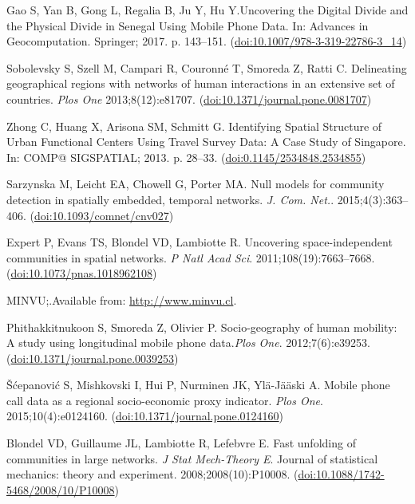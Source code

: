 \documentclass[%
preprint,
 amsmath,amssymb,
pra,
]{revtex4-1}
\begin{document}
\begin{thebibliography}{10}
Gao S, Yan B, Gong L, Regalia B, Ju Y, Hu Y.Uncovering the Digital Divide and the Physical Divide in Senegal Using Mobile Phone Data. In: Advances in Geocomputation. Springer; 2017. p. 143--151. (\href{https://dx.doi.org/10.1007/978-3-319-22786-3\_14}{doi:10.1007/978-3-319-22786-3\_14})

Sobolevsky S, Szell M, Campari R, Couronn{\'e} T, Smoreda Z, Ratti C. Delineating geographical regions with networks of human interactions in an extensive set of countries. \emph{Plos One} 2013;8(12):e81707. (\href{https://dx.doi.org/10.1371/journal.pone.0081707}{doi:10.1371/journal.pone.0081707})

Zhong C, Huang X, Arisona SM, Schmitt G. Identifying Spatial Structure of Urban Functional Centers Using Travel Survey Data: A Case Study of Singapore. In: COMP@ SIGSPATIAL; 2013. p. 28--33. (\href{https://dx.doi.org/0.1145/2534848.2534855}{doi:0.1145/2534848.2534855})

Sarzynska M, Leicht EA, Chowell G, Porter MA. Null models for community detection in spatially embedded, temporal networks. \emph{J. Com. Net.}. 2015;4(3):363--406. (\href{https://dx.doi.org/10.1093/comnet/cnv027}{doi:10.1093/comnet/cnv027})

Expert P, Evans TS, Blondel VD, Lambiotte R. Uncovering space-independent communities in spatial networks. \emph{P Natl Acad Sci}. 2011;108(19):7663--7668. (\href{https://dx.doi.org/10.1073/pnas.1018962108}{doi:10.1073/pnas.1018962108})

MINVU;.Available from: \url{http://www.minvu.cl}.

Phithakkitnukoon S, Smoreda Z, Olivier P. Socio-geography of human mobility: A study using longitudinal mobile phone data.\emph{Plos One}. 2012;7(6):e39253. (\href{https://dx.doi.org/10.1371/journal.pone.0039253}{doi:10.1371/journal.pone.0039253})

{\v{S}}{\'c}epanovi{\'c} S, Mishkovski I, Hui P, Nurminen JK,
  Yl{\"a}-J{\"a}{\"a}ski A. Mobile phone call data as a regional socio-economic proxy indicator. \emph{Plos One}. 2015;10(4):e0124160. (\href{https://dx.doi.org/10.1371/journal.pone.0124160}{doi:10.1371/journal.pone.0124160})

Blondel VD, Guillaume JL, Lambiotte R, Lefebvre E. Fast unfolding of communities in large networks. \emph{J Stat Mech-Theory E}. Journal of statistical mechanics: theory and experiment. 2008;2008(10):P10008. (\href{https://dx.doi.org/10.1088/1742-5468/2008/10/P10008}{doi:10.1088/1742-5468/2008/10/P10008})


\end{thebibliography}
\end{document}
